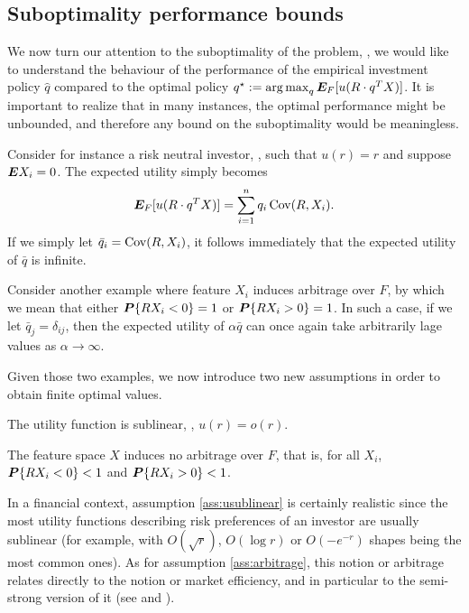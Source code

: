 \subsection{Suboptimality performance bounds}

We now turn our attention to the suboptimality of the problem, \ie, we would like to
understand the behaviour of the performance of the empirical investment policy $\hat q$
compared to the optimal policy $q^\star := \operatorname*{arg\,max}_q \bm E_F[u(R\cdot q^T X)]$. It is
important to realize that in many instances, the optimal performance might be unbounded,
and therefore any bound on the suboptimality would be meaningless.

\begin{ex}
  Consider for instance a risk neutral investor, \ie, such that $u(r)=r$ and suppose
  $\bm E X_i=0$. The expected utility simply becomes
  \[
    \bm E_F[u(R\cdot q^T X)] = \sum_{i=1}^{n}q_i\operatorname{Cov}(R,X_i).
  \]
  If we simply let $\bar q_i = \operatorname{Cov}(R,X_i)$, it follows immediately that the expected
  utility of $\bar q$ is infinite.
\end{ex}

\begin{ex}
  Consider another example where feature $X_i$ induces arbitrage over $F$, by which we
  mean that either $\bm P\{RX_i<0\} = 1$ or $\bm P\{RX_i > 0\} = 1$. In such a case, if we let
  $\bar q_j = \delta_{ij}$, then the expected utility of $\alpha\bar q$ can once again
  take arbitrarily lage values as $\alpha\to\infty$. 
\end{ex}

Given those two examples, we now introduce two new assumptions in order to obtain finite
optimal values.

\begin{assumption}\label{ass:usublinear}
  The utility function is sublinear, \ie, $u(r) = o(r)$. 
\end{assumption}

\begin{assumption}\label{ass:arbitrage}
  The feature space $X$ induces no arbitrage over $F$, that is, for all $X_i$, $\bm P\{RX_i
  < 0\} < 1$ and $\bm P\{RX_i > 0\} < 1$. 
\end{assumption}

In a financial context, assumption \ref{ass:usublinear} is certainly realistic since the
most utility functions describing risk preferences of an investor are usually sublinear
(for example, with $O(\sqrt{r})$, $O(\log r)$ or $O(-e^{-r})$ shapes being the most common
ones). As for assumption \ref{ass:arbitrage}, this notion or arbitrage relates directly to
the notion or market efficiency, and in particular to the semi-strong version of it (see
\cite{malkiel1970efficient} and \cite{fama1991efficient}).

